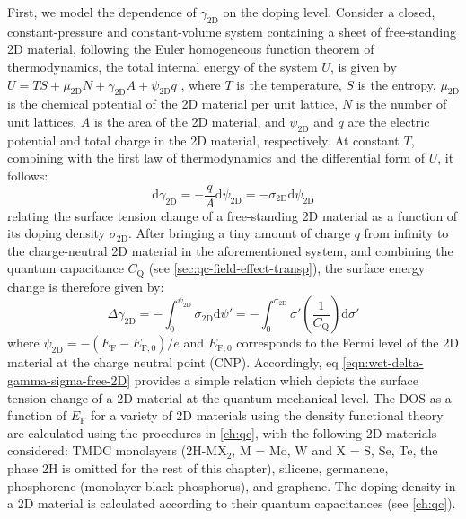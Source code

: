 First, we model the dependence of \(\gamma_{\mathrm{2D}}\) on the doping
level. Consider a closed, constant-pressure and constant-volume system
containing a sheet of free-standing 2D material, following the Euler
homogeneous function theorem of thermodynamics, the total internal
energy of the system \(U\), is given by \(U = TS + \mu_{\mathrm{2D}} N +
\gamma_{\mathrm{2D}} A + \psi_{\mathrm{2D}} q\)
\autocite{Bard_1980_electrochem_book}, where \(T\) is the temperature, \(S\) is
the entropy, \(\mu_{\mathrm{2D}}\) is the chemical potential of the 2D
material per unit lattice, \(N\) is the number of unit lattices, \(A\) is
the area of the 2D material, and \(\psi_{\mathrm{2D}}\) and \(q\) are the
electric potential and total charge in the 2D material,
respectively. At constant \(T\), combining with the first law of
thermodynamics and the differential form of \(U\), it follows:
\begin{equation}
\label{eqn:wet-dgamma-dpsi}
\mathrm{d} \gamma_{\mathrm{2D}} = -\frac{q}{A} \mathrm{d} \psi_{\mathrm{2D}}
                                = -\sigma_{\mathrm{2D}} \mathrm{d} \psi_{\mathrm{2D}}
\end{equation}
relating the surface tension change of a free-standing 2D material as
a function of its doping density \(\sigma_{\mathrm{2D}}\).
%
After bringing a tiny amount of charge
\(q\) from infinity to the charge-neutral 2D material in the
aforementioned system, and combining the quantum capacitance $C_{\mathrm{Q}}$ (see \autoref{sec:qc-field-effect-transp}),
the surface energy change is therefore given
by:
\begin{equation}
\label{eqn:wet-delta-gamma-sigma-free-2D}
\Delta \gamma_{\mathrm{2D}} = - \int_{0}^{\psi_{\mathrm{2D}}} \sigma_{\mathrm{2D}} \mathrm{d}\psi'
                            = - \int_{0}^{\sigma_{\mathrm{2D}}} \sigma' \left( \frac{1}{C_{\mathrm{Q}}}\right) \mathrm{d} \sigma'
\end{equation}
where
\(\psi_{\mathrm{2D}} = -(E_{\mathrm{F}} - E_{\mathrm{F,0}})/e\) and
\(E_{\mathrm{F,0}}\) corresponds to the Fermi level of the 2D material
at the charge neutral point (CNP). Accordingly, eq
\autoref{eqn:wet-delta-gamma-sigma-free-2D} provides a simple relation which
depicts the surface tension change of a 2D material at the
quantum-mechanical level.
%
The DOS as a function of \(E_{\mathrm{F}}\) for a variety of 2D
materials using the density functional theory are calculated using the
procedures in \autoref{ch:qc}, with the following 2D materials
considered: TMDC monolayers (2H-MX\(_{\text{2}}\), M = Mo, W and X =
S, Se, Te, the phase 2H is omitted for the rest of this chapter),
silicene, germanene, phosphorene (monolayer black phosphorus), and
graphene.  The doping density in a 2D material is calculated according
to their quantum capacitances (see \autoref{ch:qc}).

